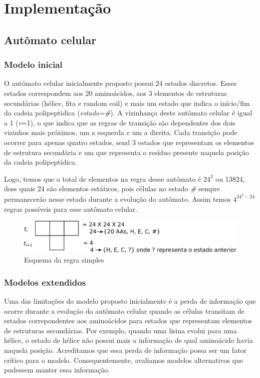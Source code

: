 \chapter{Implementação}

\section{Autômato celular}

\subsection{Modelo inicial}

O autômato celular inicialmente proposto possui 24 estados discretos. Esses estados correspondem aos 20 aminoácidos, aos 3 elementos de estruturas secundárias (hélice, fita e random coil) e mais um estado que indica o início/fim da cadeia polipeptídica (\textit{estado=\#}). A vizinhança deste autômato celular é igual a 1 (\textit{r}=1),  o que indica que as regras de transição são dependentes dos dois vizinhos mais próximos, um a esquerda e um a direita. Cada transição pode ocorrer para apenas quatro estados, send 3 estados que representam os elementos de estrutura secundária e um que representa o resíduo presente naquela posição da cadeia polipeptídica.

Logo, temos que o total de elementos na regra desse autômato é $24^3$ ou 13824, doss quais 24 são elementos estáticos, pois células no estado \textit{\#} sempre permanecerão nesse estado durante a evolução do autômato. Assim temos $4^{24^3-24}$ regras possíveis para esse autômato celular.

\begin{figure}
  \centering
  \includegraphics[width=.8\textwidth]{figures/ca_rule_scheme.pdf}
  \caption{Esquema da regra simples}
        \label{fig:ca_rule_scheme}
\end{figure}

\subsection{Modelos extendidos}

Uma das limitações do modelo proposto inicialmente é a perda de informação que ocorre durante a evolução do autômato celular quando as células transitam de estados correpondentes aos aminoácidos para estados que representam elementos de estruturas secundárias. Por exemplo, quando uma lisina evolui para uma hélice, o estado de hélice não possui mais a informação de qual aminoácido havia naquela posição. Acreditamos que essa perda de informação possa ser um fator crítico para o modelo. Consequentemente, avaliamos modelos alternativos que pudessem manter essa informação. 


